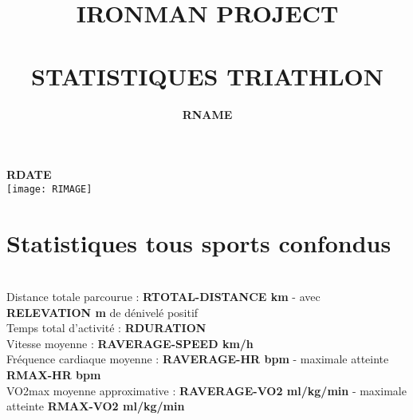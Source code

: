 \documentclass[a4paper,french,11pt]{report}
\title{	\normalsize \textsc{\uppercase{ironman project}}
		 	\\[1.2cm]
			\HRule{0.7pt} \\
			\vspace{0.5cm}
			\LARGE \textbf{\uppercase{statistiques triathlon}}	%
			\HRule{1pt} \\
			\vspace{1.7cm}
		}
\author{
		\textbf{RNAME}\\
}
\makeatletter
\def\printtitle{%
    {\centering \@title\par}}
\def\printauthor{%
    {\centering \large \@author}}
\makeatother
\begin{document}

\thispagestyle{empty}		%

\printtitle					%
\printauthor				%
\vspace{1cm}

\begin{center}

\LARGE{\textbf{RDATE}}\\
\vspace{4cm}
\texttt{[image: RIMAGE]}\\

\end{center}

\newpage



\section*{Statistiques tous sports confondus}
\thispagestyle{empty}


\\
\textbullet Distance totale parcourue : \textbf{RTOTAL-DISTANCE km} - avec \textbf{RELEVATION m} de dénivelé positif\\
\textbullet Temps total d'activité : \textbf{RDURATION} \\
\textbullet Vitesse moyenne : \textbf{RAVERAGE-SPEED km/h} \\
\textbullet Fréquence cardiaque moyenne : \textbf{RAVERAGE-HR bpm} - maximale atteinte \textbf{RMAX-HR bpm}\\
\textbullet VO2max moyenne approximative : \textbf{RAVERAGE-VO2 ml/kg/min} - maximale atteinte \textbf{RMAX-VO2 ml/kg/min}\\
\end{document}
